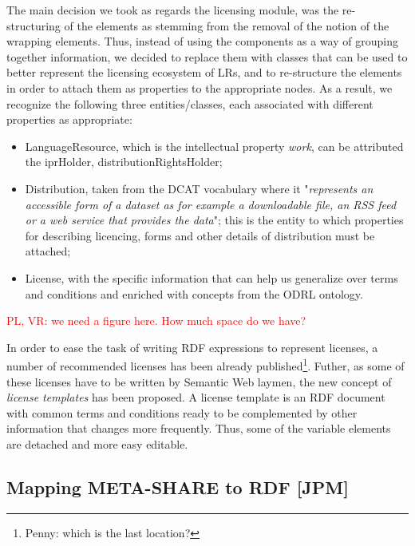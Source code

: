 \documentclass{llncs}
\begin{document}
{The main decision we took as regards the licensing module, was the re-structuring of the elements as stemming from the removal of the notion of the wrapping elements. Thus, instead of using the components as a way of grouping together information, we decided to replace them with classes that can be used to better represent the licensing ecosystem of LRs, and to re-structure the elements in order to attach them as properties to the appropriate nodes. As a result, we recognize the following three entities/classes, each associated with different properties as appropriate:
\begin{itemize}
\item LanguageResource, which is the intellectual property \textit{work}, can be attributed the iprHolder, distributionRightsHolder;
\item Distribution, taken from the DCAT vocabulary where it "\textit{represents an accessible form of a dataset as for example a downloadable file, an RSS feed or a web service that provides the data}"; this is the entity to which properties for describing licencing, forms and other details of distribution must be attached;
\item License, with the specific information that can help us generalize over terms and conditions and enriched with concepts from the ODRL ontology. 
\end{itemize}
\textcolor{red}{PL, VR: we need a figure here. How much space do we have?}

In order to ease the task of writing RDF expressions to represent licenses, a number of recommended licenses has been already published\footnote{Penny: which is the last location?}. Futher, as some of these licenses have to be written by Semantic Web laymen, the new concept of \textit{license templates} has been proposed. A license template is an RDF document with common terms and conditions ready to be complemented by other information that changes more frequently. Thus, some of the variable elements are detached and more easy editable.

\subsection{Mapping META-SHARE to RDF [JPM]}

\label{sec:conversion}

}
\end{document}
